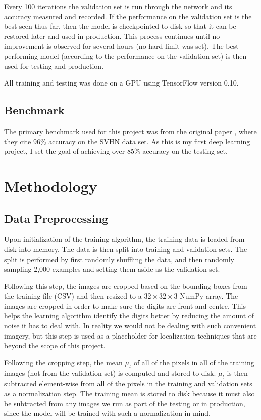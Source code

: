 \documentclass[12pt]{article}
\begin{document}
Every 100 iterations the validation set is run through the network and its accuracy measured and recorded.
If the performance on the validation set is the best seen thus far, then  the model is checkpointed to disk so that it can be restored later and used in production.
This process continues until no improvement is observed for several hours (no hard limit was set).
The best performing model (according to the performance on the validation set) is then used for testing and production.

All training and testing was done on a GPU using TensorFlow version 0.10.


\subsection{Benchmark}
The primary benchmark used for this project was from the original paper \cite{svhn_original_paper}, where they cite 96\% accuracy on the SVHN data set. As this is my first deep learning project, I set the goal of achieving over 85\% accuracy on the testing set.

\section{Methodology}
\subsection{Data Preprocessing}
Upon initialization of the training algorithm, the training data is loaded from disk into memory.
The data is then split into training and validation sets.
The split is performed by first randomly shuffling the data, and then randomly sampling 2,000 examples and setting them aside as the validation set.

Following this step, the images are cropped based on the bounding boxes from the training file (CSV) and then resized to a $32 \times 32 \times 3$ NumPy array.
The images are cropped in order to make sure the digits are front and centre.
This helps the learning algorithm identify the digits better by reducing the amount of noise it has to deal with.
In reality we would not be dealing with such convenient imagery, but this step is used as a placeholder for localization techniques that are beyond the scope of this project.

Following the cropping step, the mean $\mu_t$ of all of the pixels in all of the training images (not from the validation set) is computed and stored to disk. 
$\mu_t$ is then subtracted element-wise from all of the pixels in the training and validation sets as a normalization step.
The training mean is stored to disk because it must also be subtracted from any images we run as part of the testing or in production, since the model will be trained with such a normalization in mind.
\end{document}
